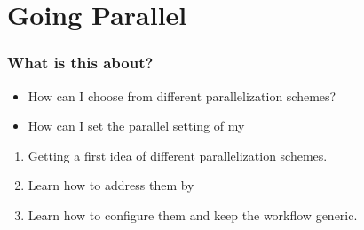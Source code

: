 \section{Going Parallel}
{   
}

\begin{frame}
	\frametitle{What is this about?}
	\begin{question}[Questions]
		\begin{itemize}
			\item How can I choose from different parallelization schemes?
			\item How can I set the parallel setting of my %
		\end{itemize}
	\end{question}
	\begin{docs}[Objectives]
		\begin{enumerate}
			\item Getting a first idea of different parallelization schemes. 
			\item Learn how to address them by \Snakemake
			\item Learn how to configure them and keep the workflow generic.
		\end{enumerate}
	\end{docs}
\end{frame}

